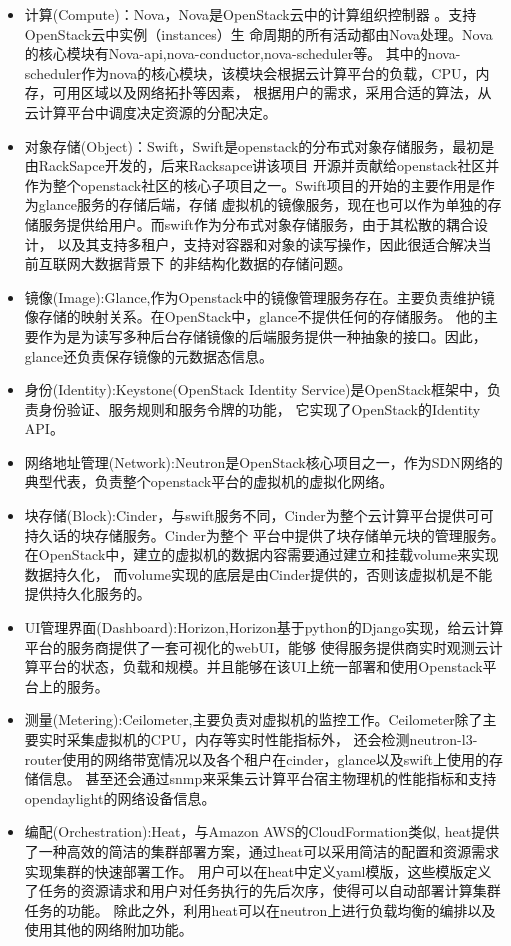 \begin{itemize}
\item 计算(Compute)：Nova，Nova是OpenStack云中的计算组织控制器 。支持OpenStack云中实例（instances）生
命周期的所有活动都由Nova处理。Nova的核心模块有Nova-api,nova-conductor,nova-scheduler等。
其中的nova-scheduler作为nova的核心模块，该模块会根据云计算平台的负载，CPU，内存，可用区域以及网络拓扑等因素，
根据用户的需求，采用合适的算法，从云计算平台中调度决定资源的分配决定。
\item 对象存储(Object)：Swift，Swift是openstack的分布式对象存储服务，最初是由RackSapce开发的，后来Racksapce讲该项目
开源并贡献给openstack社区并作为整个openstack社区的核心子项目之一。Swift项目的开始的主要作用是作为glance服务的存储后端，存储
虚拟机的镜像服务，现在也可以作为单独的存储服务提供给用户。而swift作为分布式对象存储服务，由于其松散的耦合设计，
以及其支持多租户，支持对容器和对象的读写操作，因此很适合解决当前互联网大数据背景下
的非结构化数据的存储问题。
\item 镜像(Image):Glance,作为Openstack中的镜像管理服务存在。主要负责维护镜像存储的映射关系。在OpenStack中，glance不提供任何的存储服务。
他的主要作为是为读写多种后台存储镜像的后端服务提供一种抽象的接口。因此，glance还负责保存镜像的元数据态信息。
\item 身份(Identity):Keystone(OpenStack Identity Service)是OpenStack框架中，负责身份验证、服务规则和服务令牌的功能， 它实现了OpenStack的Identity API。
\item 网络地址管理(Network):Neutron是OpenStack核心项目之一，作为SDN网络的典型代表，负责整个openstack平台的虚拟机的虚拟化网络。
\item 块存储(Block):Cinder，与swift服务不同，Cinder为整个云计算平台提供可可持久话的块存储服务。Cinder为整个
平台中提供了块存储单元块的管理服务。在OpenStack中，建立的虚拟机的数据内容需要通过建立和挂载volume来实现数据持久化，
而volume实现的底层是由Cinder提供的，否则该虚拟机是不能提供持久化服务的。
\item UI管理界面(Dashboard):Horizon,Horizon基于python的Django实现，给云计算平台的服务商提供了一套可视化的webUI，能够
使得服务提供商实时观测云计算平台的状态，负载和规模。并且能够在该UI上统一部署和使用Openstack平台上的服务。
\item 测量(Metering):Ceilometer,主要负责对虚拟机的监控工作。Ceilometer除了主要实时采集虚拟机的CPU，内存等实时性能指标外，
还会检测neutron-l3-router使用的网络带宽情况以及各个租户在cinder，glance以及swift上使用的存储信息。
甚至还会通过snmp来采集云计算平台宿主物理机的性能指标和支持opendaylight的网络设备信息。
\item 编配(Orchestration):Heat，与Amazon AWS的CloudFormation类似,
heat提供了一种高效的简洁的集群部署方案，通过heat可以采用简洁的配置和资源需求实现集群的快速部署工作。
用户可以在heat中定义yaml模版，这些模版定义了任务的资源请求和用户对任务执行的先后次序，使得可以自动部署计算集群任务的功能。
除此之外，利用heat可以在neutron上进行负载均衡的编排以及使用其他的网络附加功能。
\end{itemize}

